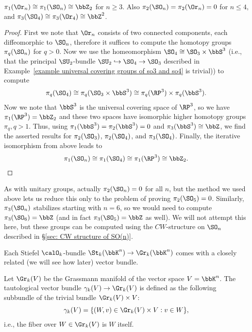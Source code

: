 \begin{cor}
    $\pi_1(\Or_n)\cong \pi_1(\SO_n)\cong\bbZ_2$ for $n\geq 3$. Also $\pi_2(\SO_n)=\pi_2(\Or_n)=0$ for $n\leq 4$, and $\pi_3(\SO_4)\cong\pi_3(\Or_4)\cong\bbZ^2$.
\end{cor}
\begin{proof}
    First we note that $\Or_n$ consists of two connected components, each diffeomorphic to $\SO_n$, therefore it suffices to compute the homotopy groups $\pi_q(\SO_n)$ for $q>0$. Now we use the homeomorphism $\SO_4\cong\SO_3\times \bbS^3$ (i.e., that the principal $\SU_2$-bundle $\SU_2\hookrightarrow \SO_4\to \SO_3$ described in Example~\ref{example universal covering groups of so3 and so4} is trivial)) to compute
    \[\pi_q(\SO_4)\cong \pi_q(\SO_3\times \bbS^3)\cong \pi_q(\RP^3)\times \pi_q(\bbS^3).\]
    Now we note that $\bbS^3$ is the universal covering space of $\RP^3$, so we have $\pi_1(\RP^3)=\bbZ_2$ and these two spaces have isomorphic higher homotopy groups $\pi_q, q>1$. Thus, using $\pi_1(\bbS^3)=\pi_2(\bbS^3)=0$ and $\pi_3(\bbS^3)\cong \bbZ$, we find the asserted results for $\pi_2(\SO_3)$, $\pi_2(\SO_4)$, and $\pi_3(\SO_4)$. Finally, the iterative isomorphism from above leads to
    \[
        \pi_1(\SO_n)\cong \pi_1(\SO_4)\cong \pi_1(\RP^3)\cong \bbZ_2.
    \]
\end{proof}
\begin{rem}
    As with unitary groups, actually $\pi_2(\SO_n)=0$ for all $n$, but the method we used above lets us reduce this only to the problem of proving $\pi_2(\SO_5)=0$. Similarly, $\pi_3(\SO_n)$ stabilizes starting with $n=6$, so we would need to compute $\pi_3(\SO_6)=\bbZ$ (and in fact $\pi_3(\SO_5)=\bbZ$ as well). We will not attempt this here, but these groups can be computed using the $CW$-structure on $\SO_n$ described in \S\ref{sec: CW structure of SO(n)}.
\end{rem}


Each Stiefel $\calO_k$-bundle $\St_k(\bbK^n)\to \Gr_k(\bbK^n)$ comes with a closely related (we will see how later) vector bundle.

\begin{defn}\label{def tautological bundles}
    Let $\Gr_k(V)$ be the Grassmann manifold of the vector space $V=\bbK^n$. The tautological vector bundle $\gamma_k(V)\to \Gr_k(V)$ is defined as the following subbundle of the trivial bundle $\Gr_k(V)\times V$:
    \[\gamma_k(V)=\{(W,v)\in \Gr_k(V)\times V: v\in W\},\]
    i.e., the fiber over $W\in \Gr_k(V)$ is $W$ itself.
\end{defn}

